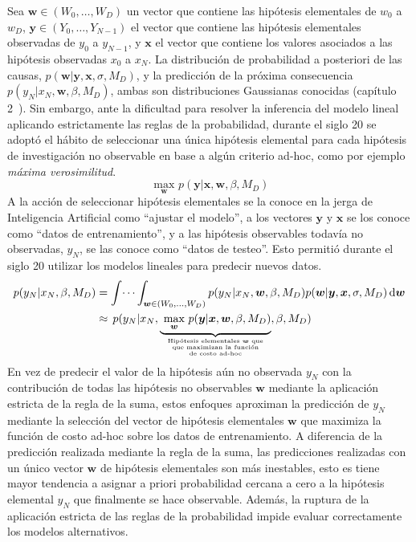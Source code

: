 \documentclass[a4paper,11pt]{book}
\newcommand\hfrac[2]{\genfrac{}{}{0pt}{}{#1}{#2}} %
\theoremstyle{definition}
\begin{document}

Sea $\bm{w} \in (W_0, \dots, W_D)$ un vector que contiene las hip\'otesis elementales de $w_0$ a $w_D$, $\bm{y} \in (Y_0, \dots, Y_{N-1})$ el vector que contiene las hip\'otesis elementales observadas de $y_0$ a $y_{N-1}$, y $\bm{x}$ el vector que contiene los valores asociados a las hip\'otesis observadas $x_0$ a $x_N$.
%
La distribuci\'on de probabilidad a posteriori de las causas, $p(\bm{w}|\bm{y}, \bm{x}, \sigma, M_D)$, y la predicci\'on de la pr\'oxima consecuencia $p(y_{N}|x_{N}, \bm{w}, \beta, M_D)$, ambas son distribuciones Gaussianas conocidas (cap\'itulo 2~\cite{Bishop2006}).
%
Sin embargo, ante la dificultad para resolver la inferencia del modelo lineal aplicando estrictamente las reglas de la probabilidad, durante el siglo 20 se adopt\'o el h\'abito de seleccionar una \'unica hip\'otesis elemental para cada hip\'otesis de investigaci\'on no observable en base a alg\'un criterio ad-hoc, como por ejemplo \emph{m\'axima verosimilitud}.
%
\begin{equation*}
 \underset{\bm{w}}{\text{ max }} p(\bm{y} | \bm{x}, \bm{w}, \beta, M_D)
\end{equation*}
%
A la acci\'on de seleccionar hip\'otesis elementales se la conoce en la jerga de Inteligencia Artificial como ``ajustar el modelo'', a los vectores $\bm{y}$ y $\bm{x}$ se los conoce como ``datos de entrenamiento'', y a las hip\'otesis observables todav\'ia no observadas, $y_N$, se las conoce como ``datos de testeo''.
%
Esto permiti\'o durante el siglo 20 utilizar los modelos lineales para predecir nuevos datos.
%
\begin{equation} \label{eq:prediccion_ad_hoc}
\begin{split}
p(y_N|x_N, \beta, M_D)
 & = \int\dots\int_{\bm{w} \in (W_0, \dots, W_D)} p(y_{N}|x_{N}, \bm{w}, \beta, M_D) p(\bm{w}|\bm{y}, \bm{x},\sigma, M_D) \, \text{d}\bm{w} \\
 &\approx \,  p(y_N|x_{N}, \underbrace{\underset{\bm{w}}{\text{ max }} p(\bm{y} | \bm{x}, \bm{w}, \beta, M_D)}_{\hfrac{\text{Hip\'otesis elementales $\bm{w}$ que}}{\hfrac{\text{que maximizan la funci\'on}}{\text{de costo ad-hoc}} } } , \beta, M_D)
\end{split}
\end{equation}
%
En vez de predecir el valor de la hip\'otesis a\'un no observada $y_N$ con la contribuci\'on de todas las hip\'otesis no observables $\bm{w}$ mediante la aplicaci\'on estricta de la regla de la suma, estos enfoques aproximan la predicci\'on de $y_N$ mediante la selecci\'on del vector de hip\'otesis elementales $\bm{w}$ que maximiza la funci\'on de costo ad-hoc sobre los datos de entrenamiento.
%
A diferencia de la predicci\'on realizada mediante la regla de la suma, las predicciones realizadas con un \'unico vector $\bm{w}$ de hip\'otesis elementales son m\'as inestables, esto es tiene mayor tendencia a asignar a priori probabilidad cercana a cero a la hip\'otesis elemental $y_N$ que finalmente se hace observable.
%
Adem\'as, la ruptura de la aplicaci\'on estricta de las reglas de la probabilidad impide evaluar correctamente los modelos alternativos.
\end{document}
